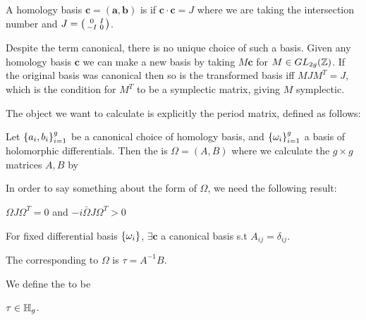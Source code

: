 \documentclass{article}
\begin{document}
\begin{definition}
	A homology basis $\bm{c} = (\bm{a},\bm{b})$ is  if $\bm{c} \cdot \bm{c} = J$ where we are taking the intersection number and $J=\begin{psmallmatrix} 0 & I \\ -I & 0 \end{psmallmatrix}$. 
\end{definition}
\begin{remark}
	Despite the term canonical, there is no unique choice of such a basis. Given any homology basis $\bm{c}$ we can make a new basis by taking $M\bm{c}$ for $M\in GL_{2g}(\mathbb{Z})$. If the original basis was canonical then so is the transformed basis iff $MJM^T = J$, which is the condition for $M^T$ to be a symplectic matrix, giving $M$ symplectic. 
\end{remark}

The object we want to calculate is explicitly the period matrix, defined as follows:
\begin{definition}
	Let $\left\{ a_i, b_i \right\}_{i=1}^g$ be a canonical choice of homology basis, and $\left\{ \omega_i \right\}_{i=1}^g$ a basis of holomorphic differentials. Then the  is $\Omega = (A,B)$ where we calculate the $g\times g$ matrices $A,B$ by 
\end{definition}

In order to say something about the form of $\Omega$, we need the following result:
\begin{prop}
	$\Omega J \Omega^T = 0$ and $-i\bar{\Omega}J\Omega^T > 0$
\end{prop}
\begin{corollary}
 For fixed differential basis $\left\{ \omega_i \right\}$, $\exists \bm{c}$ a canonical basis s.t $A_{ij} = \delta_{ij}$. 
\end{corollary}

\begin{definition}
	The  corresponding to $\Omega$ is $\tau = A^{-1}B$. 
\end{definition}

\begin{definition}
	We define the  to be 
\end{definition}

\begin{lemma} $\tau \in \mathbb{H}_g$.  
\end{lemma}
\end{document}
